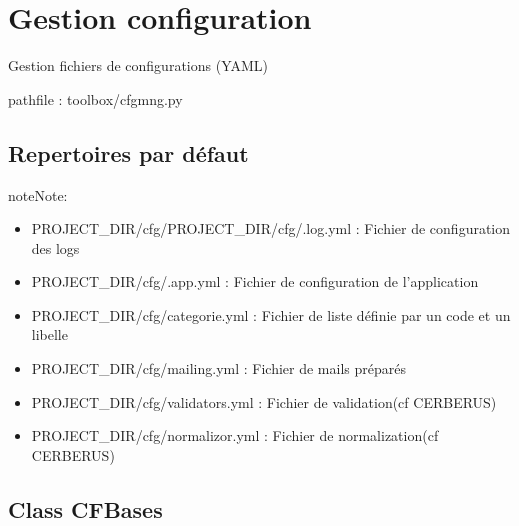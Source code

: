 \documentclass[letterpaper,10pt,french]{sphinxmanual}
\begin{document}
\chapter{Gestion configuration}
\label{\detokenize{classes/cfgloader:module-toolbox.cfgmng}}\label{\detokenize{classes/cfgloader:gestion-configuration}}\label{\detokenize{classes/cfgloader::doc}}
Gestion fichiers de configurations (YAML)

pathfile : toolbox/cfgmng.py


\section{Repertoires par défaut}
\label{\detokenize{classes/cfgloader:repertoires-par-defaut}}
\begin{sphinxadmonition}{note}{Note:}\begin{itemize}
\item {} 
PROJECT\_DIR/cfg/PROJECT\_DIR/cfg/.log.yml : Fichier de configuration des logs

\item {} 
PROJECT\_DIR/cfg/.app.yml : Fichier de configuration de l’application

\item {} 
PROJECT\_DIR/cfg/categorie.yml : Fichier de liste définie par un code et un libelle

\item {} 
PROJECT\_DIR/cfg/mailing.yml : Fichier de mails préparés

\item {} 
PROJECT\_DIR/cfg/validators.yml : Fichier de validation(cf CERBERUS)

\item {} 
PROJECT\_DIR/cfg/normalizor.yml : Fichier de normalization(cf CERBERUS)

\end{itemize}
\end{sphinxadmonition}


\section{Class CFBases}
\label{\detokenize{classes/cfgloader:class-cfbases}}
\end{document}
